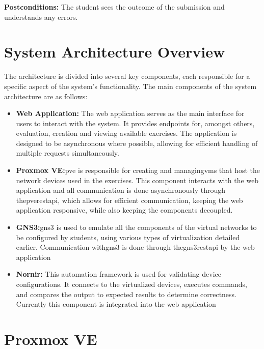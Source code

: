         \textbf{Postconditions:} The student sees the outcome of the submission and understands any errors.


\section{System Architecture Overview}
    The architecture is divided into several key components, each responsible for a specific aspect of the system's functionality. 
    The main components of the system architecture are as follows:

    \begin{itemize}
        \item \textbf{Web Application:} The web application serves as the main interface for users to interact with the system. It provides 
        endpoints for, amongst others, evaluation, creation  and viewing available exercises. The application is designed to be asynchronous 
        where possible, allowing for efficient handling of multiple requests simultaneously.
        
        \item \textbf{Proxmox VE:}\ac{pve} is responsible for creating and managing\ac{vm}s that host the network devices used in 
        the exercises. This component interacts with the web application and all communication is done asynchronously through 
        the\ac{pve}\ac{rest}\ac{api}, which allows for efficient communication, keeping the web application responsive, while also 
        keeping the components decoupled.
        
        \item \textbf{GNS3:}\ac{gns3} is used to emulate all the components of the virtual networks to be configured by students, 
        using various types of virtualization detailed earlier. Communication with\ac{gns3} is done through 
        the\ac{gns3}\ac{rest}\ac{api} by the web application

        \item \textbf{Nornir:} This automation framework is used for validating device configurations. It connects to the 
        virtualized devices, executes commands, and compares the output to expected results to determine correctness.
        Currently this component is integrated into the web application
    \end{itemize}

\section{Proxmox VE}

